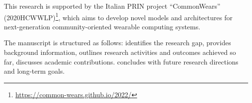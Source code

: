 \documentclass[runningheads]{llncs}
\begin{document}
This research is supported by the Italian PRIN project ``CommonWears'' (2020HCWWLP)\footnote{\url{https://common-wears.github.io/2022/}},
which aims to develop novel models and architectures for next-generation community-oriented wearable computing systems.

The manuscript is structured as follows:
 identifies the research gap,
 provides background information,
 outlines research activities and outcomes achieved so far,
 discusses academic contributions.
%
 concludes with future research directions and long-term goals.




\end{document}
